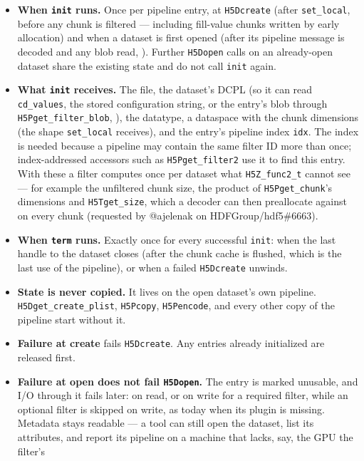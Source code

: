 \documentclass[../RFC-HDFG-2026-003.tex]{subfiles}
\begin{document}
\begin{itemize}
\item \textbf{When \texttt{init} runs.}  Once per pipeline entry, at
  \texttt{H5Dcreate} (after \texttt{set\_local}, before any chunk is
  filtered --- including fill-value chunks written by early allocation)
  and when a dataset is first opened (after its pipeline message is
  decoded and any blob read, ).  Further
  \texttt{H5Dopen} calls on an already-open dataset share the existing
  state and do not call \texttt{init} again.
\item \textbf{What \texttt{init} receives.}  The file, the dataset's DCPL
  (so it can read \texttt{cd\_values}, the stored configuration string, or
  the entry's blob through \texttt{H5Pget\_filter\_blob},
  ), the datatype, a dataspace with the chunk
  dimensions (the shape \texttt{set\_local} receives), and the entry's
  pipeline index \texttt{idx}.  The index is needed because a pipeline may
  contain the same filter ID more than once; index-addressed accessors
  such as \texttt{H5Pget\_filter2} use it to find this entry.  With these
  a filter computes once per dataset what \texttt{H5Z\_func2\_t} cannot
  see --- for example the unfiltered chunk size, the product of
  \texttt{H5Pget\_chunk}'s dimensions and \texttt{H5Tget\_size}, which a
  decoder can then preallocate against on every chunk
  (requested by @ajelenak on HDFGroup/hdf5\#6663).
\item \textbf{When \texttt{term} runs.}  Exactly once for every
  successful \texttt{init}: when the last handle to the dataset closes
  (after the chunk cache is flushed, which is the last use of the
  pipeline), or when a failed \texttt{H5Dcreate} unwinds.
\item \textbf{State is never copied.}  It lives on the open dataset's own
  pipeline.  \texttt{H5Dget\_create\_plist}, \texttt{H5Pcopy},
  \texttt{H5Pencode}, and every other copy of the pipeline start without
  it.
\item \textbf{Failure at create} fails \texttt{H5Dcreate}.  Any entries
  already initialized are released first.
\item \textbf{Failure at open does not fail \texttt{H5Dopen}.}  The entry
  is marked unusable, and I/O through it fails later: on read, or on write
  for a required filter, while an optional filter is skipped on write,
  as today when its plugin is missing.  Metadata stays readable --- a tool
  can still open the dataset, list its attributes, and report its
  pipeline on a machine that lacks, say, the GPU the filter's

\end{itemize}
\end{document}
